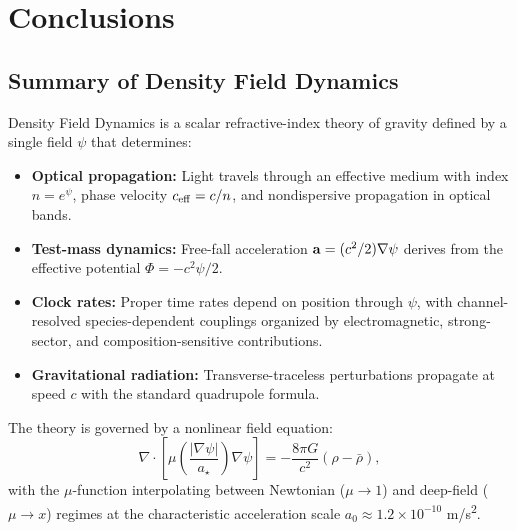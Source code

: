 
\section{Conclusions}\label{sec:conclusions}

\subsection{Summary of Density Field Dynamics}\label{sec:conclusions-summary}

Density Field Dynamics is a scalar refractive-index theory of gravity defined by a single field $\psi$ that determines:

\begin{itemize}
\item \textbf{Optical propagation:} Light travels through an effective medium with index $n = e^\psi$, phase velocity $c_{\rm eff} = c/n$, and nondispersive propagation in optical bands.

\item \textbf{Test-mass dynamics:} Free-fall acceleration $\mathbf{a} = (c^2/2)\nabla\psi$ derives from the effective potential $\Phi = -c^2\psi/2$.

\item \textbf{Clock rates:} Proper time rates depend on position through $\psi$, with channel-resolved species-dependent couplings organized by electromagnetic, strong-sector, and composition-sensitive contributions.

\item \textbf{Gravitational radiation:} Transverse-traceless perturbations propagate at speed $c$ with the standard quadrupole formula.
\end{itemize}

The theory is governed by a nonlinear field equation:
\begin{equation}
\nabla \cdot \left[\mu\left(\frac{|\nabla\psi|}{a_\star}\right)\nabla\psi\right] = -\frac{8\pi G}{c^2}(\rho - \bar{\rho}),
\end{equation}
with the $\mu$-function interpolating between Newtonian ($\mu \to 1$) and deep-field ($\mu \to x$) regimes at the characteristic acceleration scale $a_0 \approx 1.2 \times 10^{-10}$ m/s\textsuperscript{2}.

